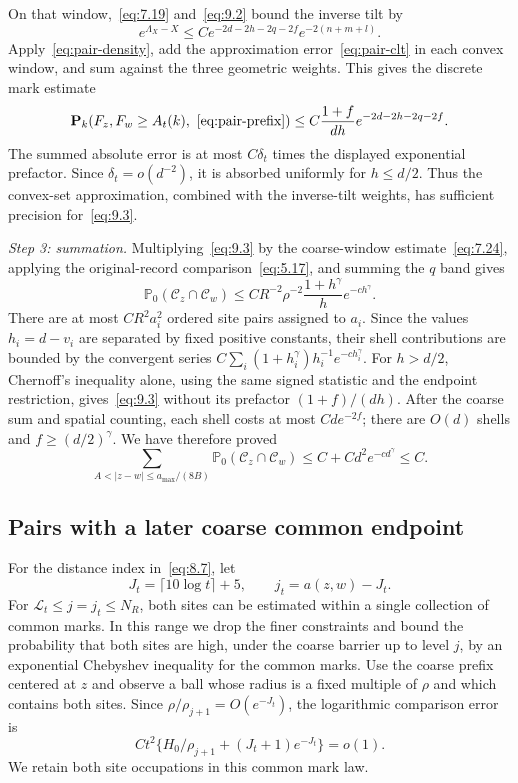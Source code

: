 \documentclass[11pt,letterpaper,reqno]{amsart}
\newif\ifrevmarks \revmarkstrue
\newcommand{\add}[1]{\ifrevmarks\textcolor{revorange}{#1}\else#1\fi}
\numberwithin{equation}{section}
\theoremstyle{remark}
\begin{document}
On that window,~\eqref{eq:7.19} and~\eqref{eq:9.2} bound the inverse tilt by
\[
 e^{\Lambda_X-X}\le
 C e^{-2d-2h-2q-2f}e^{-2(n+m+l)}.
\]
Apply~\eqref{eq:pair-density}, add the approximation error~\eqref{eq:pair-clt} in each convex window, and sum against the three geometric weights. This gives the discrete mark estimate
\begin{equation}\label{eq:9.3}
 \mathbf P_k(F_z,F_w\ge A_t(k),\ \eqref{eq:pair-prefix})
 \le C\frac{1+f}{dh}e^{-2d-2h-2q-2f}.
\end{equation}
The summed absolute error is at most $C\delta_t$ times the displayed exponential prefactor. Since $\delta_t=o(d^{-2})$, it is absorbed uniformly for $h\le d/2$. Thus the convex-set approximation, combined with the inverse-tilt weights, has sufficient precision for~\eqref{eq:9.3}.

\add{\emph{Step 3: summation.}} Multiplying~\eqref{eq:9.3} by the coarse-window estimate~\eqref{eq:7.24}, applying the original-record comparison~\eqref{eq:5.17}, and summing the $q$ band gives
\begin{equation}\label{eq:9.4}
 \mathbb P_0(\mathcal C_z\cap\mathcal C_w)
 \le CR^{-2}\rho^{-2}\frac{1+h^\gamma}{h}e^{-c h^\gamma}.
\end{equation}
There are at most $CR^2a_i^2$ ordered site pairs assigned to $a_i$. Since the values $h_i=d-v_i$ are separated by fixed positive constants, their shell contributions are bounded by the convergent series
$C\sum_i(1+h_i^\gamma)h_i^{-1}e^{-c h_i^\gamma}$.
For $h>d/2$, Chernoff's inequality alone, using the same signed statistic and the endpoint restriction, gives~\eqref{eq:9.3} without its prefactor $(1+f)/(dh)$. After the coarse sum and spatial counting, each shell costs at most $Cd e^{-2f}$; there are $O(d)$ shells and $f\ge(d/2)^\gamma$. We have therefore proved
\begin{equation}\label{eq:9.5}
 \sum_{A<|z-w|\le a_{\max}/(8B)}
 \mathbb P_0(\mathcal C_z\cap\mathcal C_w)
 \le C+Cd^2e^{-c d^\gamma}\le C.
\end{equation}

\subsection{Pairs with a later coarse common endpoint}\label{sec:coarsepairs}
For the distance index in~\eqref{eq:8.7}, let
\begin{equation}\label{eq:9.6}
J_t=\lceil10\log t\rceil+5,\qquad j_t=a(z,w)-J_t.
\end{equation}
For $\mathcal L_t\le j=j_t\le N_R$, both sites can be estimated within a single collection of common marks. \add{In this range we drop the finer constraints and bound the probability that both sites are high, under the coarse barrier up to level $j$, by an exponential Chebyshev inequality for the common marks.} Use the coarse prefix centered at $z$ and observe a ball whose radius is a fixed multiple of $\rho$ and which contains both sites. Since $\rho/\rho_{j+1}=O(e^{-J_t})$, the logarithmic comparison error is
\begin{equation}\label{eq:9.7}
Ct^2\{H_0/\rho_{j+1}+(J_t+1)e^{-J_t}\}=o(1).
\end{equation}
We retain both site occupations in this common mark law.
\end{document}
